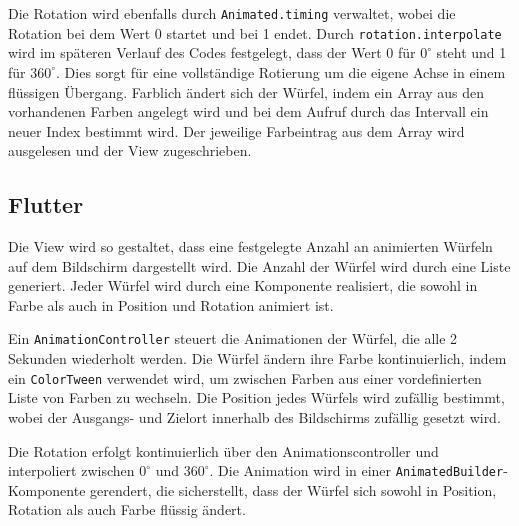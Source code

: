 Die Rotation wird ebenfalls durch \texttt{Animated.timing} verwaltet, wobei die Rotation bei dem Wert 0 startet und bei 1 endet. Durch \texttt{rotation.interpolate} wird im späteren Verlauf des Codes festgelegt, dass der Wert 0 für \(0^\circ\) steht und 1 für \(360^\circ\). Dies sorgt für eine vollständige Rotierung um die eigene Achse in einem flüssigen Übergang. Farblich ändert sich der Würfel, indem ein Array aus den vorhandenen Farben angelegt wird und bei dem Aufruf durch das Intervall ein neuer Index bestimmt wird. Der jeweilige Farbeintrag aus dem Array wird ausgelesen und der View zugeschrieben.

\subsection*{Flutter}

Die View wird so gestaltet, dass eine festgelegte Anzahl an animierten Würfeln auf dem Bildschirm dargestellt wird. Die Anzahl der Würfel wird durch eine Liste generiert. Jeder Würfel wird durch eine Komponente realisiert, die sowohl in Farbe als auch in Position und Rotation animiert ist. 

Ein \texttt{AnimationController} steuert die Animationen der Würfel, die alle 2 Sekunden wiederholt werden. Die Würfel ändern ihre Farbe kontinuierlich, indem ein \texttt{ColorTween} verwendet wird, um zwischen Farben aus einer vordefinierten Liste von Farben zu wechseln. Die Position jedes Würfels wird zufällig bestimmt, wobei der Ausgangs- und Zielort innerhalb des Bildschirms zufällig gesetzt wird. 

Die Rotation erfolgt kontinuierlich über den Animationscontroller und interpoliert zwischen \(0^\circ\) und \(360^\circ\). Die Animation wird in einer \texttt{AnimatedBuilder}-Komponente gerendert, die sicherstellt, dass der Würfel sich sowohl in Position, Rotation als auch Farbe flüssig ändert.

